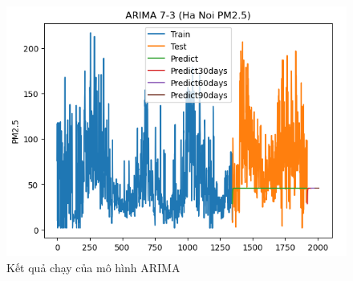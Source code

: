 \begin{figure}[H]
\begin{minipage}{0.15\textwidth}
    \includegraphics[width=1\textwidth]{img/final/ARIMA/90D/ARIMA_7_3_HN.png}
    \end{minipage}
    \hfill
    
    \caption{Kết quả chạy của mô hình ARIMA}
    \label{fig:ARIMA}
\end{figure}
